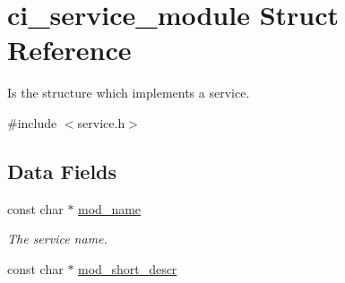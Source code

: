\hypertarget{structci__service__module}{
\section{ci\_\-service\_\-module Struct Reference}
\label{structci__service__module}
}


Is the structure which implements a service.  


{\ttfamily \#include $<$service.h$>$}\subsection*{Data Fields}
\begin{DoxyCompactItemize}
\item 
\hypertarget{structci__service__module_a2f37848274954bf289c4827c9c0ee735}{
const char $\ast$ \hyperlink{structci__service__module_a2f37848274954bf289c4827c9c0ee735}{mod\_\-name}}
\label{structci__service__module_a2f37848274954bf289c4827c9c0ee735}

\begin{DoxyCompactList}\small\item\em The service name. \item\end{DoxyCompactList}\item 
\hypertarget{structci__service__module_af35514696bd22c2b1300d837b9bd86f5}{
const char $\ast$ \hyperlink{structci__service__module_af35514696bd22c2b1300d837b9bd86f5}{mod\_\-short\_\-descr}}
\label{structci__service__module_af35514696bd22c2b1300d837b9bd86f5}


\end{DoxyCompactItemize}
